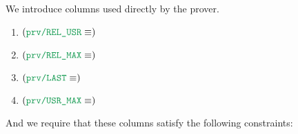 \def\proverColA {\loc{prv\separator{}USR\_MAX}}
\def\proverColB {\loc{prv\separator{}REL\_USR}}
\def\proverColC {\loc{prv\separator{}REL\_MAX}}
\def\proverColD {\loc{prv\separator{}LAST}}
We introduce columns used directly by the prover.
\begin{enumerate}
        \item $(\proverColB \equiv)$ \proverColumnRelativeUserTransactionNumber    {}
        \item $(\proverColC \equiv)$ \proverColumnRelativeUserTransactionNumberMax {}
        \item $(\proverColD \equiv)$ \proverColumnIsLastUserTransactionOfBlock     {}
        \item $(\proverColA \equiv)$ \proverColumnUserTransactionNumberMax         {}
\end{enumerate}
And we require that these columns satisfy the following constraints:
